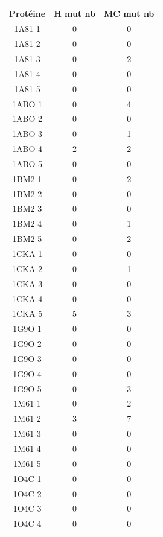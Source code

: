 \documentclass[a4paper,12pt]{article}
\begin{document}
    \begin{table}[h]
      \centering

      \begin{tabular}{|c|c|c|}


        \hline
        Protéine & H mut nb & MC mut nb \\
        \hline
        1A81 1 & 0  & 0 \\    
        1A81 2 & 0  & 0 \\
        1A81 3 & 0  & 2 \\
        1A81 4 & 0  & 0 \\
        1A81 5 & 0  & 0 \\
        1ABO 1 & 0  & 4 \\ 
        1ABO 2 & 0  & 0 \\
        1ABO 3 & 0  & 1 \\
        1ABO 4 & 2  & 2 \\
        1ABO 5 & 0  & 0 \\
        1BM2 1 & 0  & 2 \\
        1BM2 2 & 0  & 0 \\
        1BM2 3 & 0  & 0 \\
        1BM2 4 & 0  & 1 \\
        1BM2 5 & 0  & 2 \\
        1CKA 1 & 0  & 0 \\
        1CKA 2 & 0  & 1 \\
        1CKA 3 & 0  & 0 \\
        1CKA 4 & 0  & 0 \\
        1CKA 5 & 5  & 3 \\
        1G9O 1 & 0  & 0 \\
        1G9O 2 & 0  & 0 \\
        1G9O 3 & 0  & 0 \\
        1G9O 4 & 0  & 0 \\
        1G9O 5 & 0  & 3 \\
        1M61 1 & 0  & 2 \\
        1M61 2 & 3  & 7 \\
        1M61 3 & 0  & 0 \\
        1M61 4 & 0  & 0 \\
        1M61 5 & 0  & 0 \\
        1O4C 1 & 0  & 0 \\
        1O4C 2 & 0  & 0 \\
        1O4C 3 & 0  & 0 \\
        1O4C 4 & 0  & 0 \\

\end{tabular}
\end{table}
\end{document}
